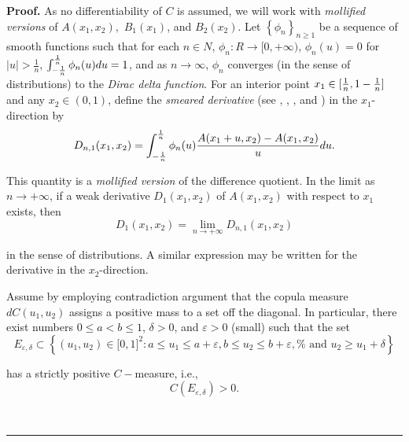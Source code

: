 \documentclass[onecolumn]{article}
\newenvironment{proof}[1][Proof]{\noindent\textbf{#1.} }{\ \rule{0.5em}{0.5em}}
\begin{document}
\begin{proof}
As no differentiability of $C$ is assumed, we will work with \textit{%
mollified versions} of $A(x_{1},x_{2}),$ $B_{1}(x_{1})$, and $B_{2}(x_{2})$.
Let $\left\{ \phi _{n}\right\} _{n\geq 1}$ be a sequence of smooth functions
such that for each $n\in N$, $\phi _{n}:R\rightarrow \lbrack 0,+\infty )$, $%
\phi _{n}(u)=0$ for $\left\vert u\right\vert >\frac{1}{n}$, $\int_{-\frac{1}{%
n}}^{\frac{1}{n}}\phi _{n}(u)du=1$, and as $n\rightarrow \infty $, $\phi
_{n} ${} converges (in the sense of distributions) to the \textit{Dirac
delta function}. For an interior point $x_{1}\in \lbrack \frac{1}{n},1-\frac{%
1}{n}] $ and any $x_{2}\in (0,1)$, define the \textit{smeared derivative}
(see \cite[Section 5.3]{[20]}, \cite[Appendix C5]{[20]}, \cite[Chapter 9]%
{[19]}, and \cite[Chapter 1]{[21]}) in the $x_{1}$-direction by%
\begin{equation}
D_{n,1}(x_{1},x_{2})=\int_{-\frac{1}{n}}^{\frac{1}{n}}\phi _{n}(u)\frac{%
A(x_{1}+u,x_{2})-A(x_{1},x_{2})}{u}du.  \label{106}
\end{equation}

This quantity is a \textit{mollified version} of the difference quotient. In
the limit as $n\rightarrow +\infty $, if a weak derivative $%
D_{1}(x_{1},x_{2})$ of $A(x_{1},x_{2})$ with respect to $x_{1}$ exists, then%
\begin{equation}
D_{1}(x_{1},x_{2})=\underset{n\rightarrow +\infty }{\lim }%
D_{n,1}(x_{1},x_{2})  \label{107}
\end{equation}

in the sense of distributions. A similar expression may be written for the
derivative in the $x_{2}$-direction.

Assume by employing contradiction argument that the copula measure $%
dC(u_{1},u_{2})$ assigns a positive mass to a set off the diagonal. In
particular, there exist numbers $0\leq a<b\leq 1$, $\delta >0$, and $%
\varepsilon >0$ (small) such that the set 
\begin{equation}
E_{\varepsilon ,\delta }\subset \left\{ (u_{1},u_{2})\in \lbrack
0,1]^{2}:a\leq u_{1}\leq a+\varepsilon ,b\leq u_{2}\leq b+\varepsilon ,\text{%
and }u_{2}\geq u_{1}+\delta \right\}  \label{107a}
\end{equation}

has a strictly positive $C-$measure, i.e.,%
\begin{equation}
C(E_{\varepsilon ,\delta })>0.  \label{108a}
\end{equation}


\end{proof}
\end{document}
